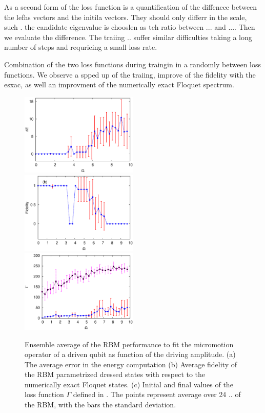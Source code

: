 \documentclass[pra,twocolumn,showkeys,preprintnumbers, amsmath,amssymb, aps,A4paper]{revtex4-1}
\begin{document}
As a second form of the loss function is a quantification of the diffenece between the lefhs vectors and the initila vectors. They should only differr in the scale, such . the candidate eigenvalue is chooslen as teh ratio between ... and .... Then we evaluate the difference.  The traiing .. suffer similar difficulties taking a long number of steps and requrieing a small loss rate. 


Combination of the two loss functions during traingin in a randomly between loss functions. We observe a spped up of the traiing, improve of the fidelity with the esxac, as well an improvment of the numerically exact Floquet spectrum.


\begin{figure}
\centering
\includegraphics[width=0.5\textwidth]{EnergyError.eps}
\includegraphics[width=0.5\textwidth]{Fidelity.eps}
\includegraphics[width=0.5\textwidth]{LossInitFinal.eps}
\caption{\label{fig:MicromotionResults} Ensemble average of the RBM performance to fit the micromotion operator of a driven qubit as function of the driving amplitude. (a) The average error in the energy computation (b) Average fidelity of the RBM parametrized dressed states with respect to the numerically exact Floquet states. (c) Initial and final values of the loss function $\Gamma$ defined in . The points represent average over 24 .. of the RBM, with the bars the standard deviation. }
\end{figure}
\end{document}
